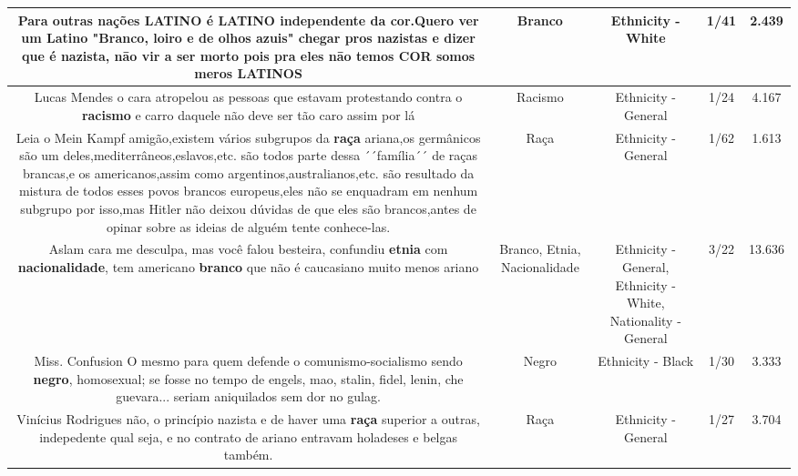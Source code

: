 \documentclass[11pt]{article}
\newlength\mylength
\begin{document}
\begin{center}
\begin{longtable}{|C{.65\mylength}|C{.30\mylength}|C{.12\mylength}|C{.12\mylength}|C{.12\mylength}|}
  \small Para outras nações LATINO é LATINO independente da cor.Quero ver um Latino "\textbf{Branco}, loiro e de olhos azuis" chegar pros nazistas e dizer que é nazista, nāo vir a ser morto pois pra eles nāo temos COR somos meros LATINOS\normalsize   & Branco & Ethnicity - White & 1/41 & 2.439 \\  \hline
  \small Lucas Mendes o cara atropelou as pessoas que estavam protestando contra o \textbf{racismo} e carro daquele não deve ser tão caro assim por lá\normalsize   & Racismo & Ethnicity - General & 1/24 & 4.167 \\  \hline
  \small Leia o Mein Kampf amigão,existem vários subgrupos da \textbf{raça} ariana,os germânicos são um deles,mediterrâneos,eslavos,etc. são todos parte dessa ´´família´´ de raças brancas,e os americanos,assim como argentinos,australianos,etc. são resultado da mistura de todos esses povos brancos europeus,eles não se enquadram em nenhum subgrupo por isso,mas Hitler não deixou dúvidas de que eles são brancos,antes de opinar sobre as ideias de alguém tente conhece-las.\normalsize   & Raça & Ethnicity - General & 1/62 & 1.613 \\  \hline
  \small Aslam cara me desculpa, mas você falou besteira, confundiu \textbf{etnia} com \textbf{nacionalidade}, tem americano \textbf{branco} que não é caucasiano muito menos ariano\normalsize   & Branco, Etnia, Nacionalidade & Ethnicity - General, Ethnicity - White, Nationality - General & 3/22 & 13.636 \\  \hline
  \small Miss. Confusion O mesmo para quem defende o comunismo-socialismo sendo \textbf{negro}, homosexual; se fosse no tempo de engels, mao, stalin, fidel, lenin, che guevara... seriam aniquilados sem dor no gulag.\normalsize   & Negro & Ethnicity - Black & 1/30 & 3.333 \\  \hline
  \small Vinícius Rodrigues não, o princípio nazista e de haver uma \textbf{raça} superior a outras, indepedente qual seja, e no contrato de ariano entravam holadeses e belgas também.\normalsize   & Raça & Ethnicity - General & 1/27 & 3.704 \\  \hline

\end{longtable}
\end{center}
\end{document}
